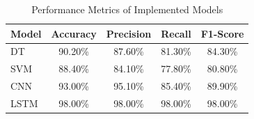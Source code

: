\documentclass[conference]{IEEEtran}
\begin{document}
\begin{table}[ht]
\centering
\caption{Performance Metrics of Implemented Models}
\label{tab:performance_metrics}
\begin{tabular}{|l|c|c|c|c|}
\hline
\textbf{Model} & \textbf{Accuracy} & \textbf{Precision} & \textbf{Recall} & \textbf{F1-Score} \\
\hline
DT & 90.20\% & 87.60\% & 81.30\% & 84.30\% \\
SVM & 88.40\% & 84.10\% & 77.80\% & 80.80\% \\
CNN & 93.00\% & 95.10\% & 85.40\% & 89.90\% \\
LSTM & 98.00\% & 98.00\% & 98.00\% & 98.00\% \\
\hline
\end{tabular}
\end{table}
\end{document}
